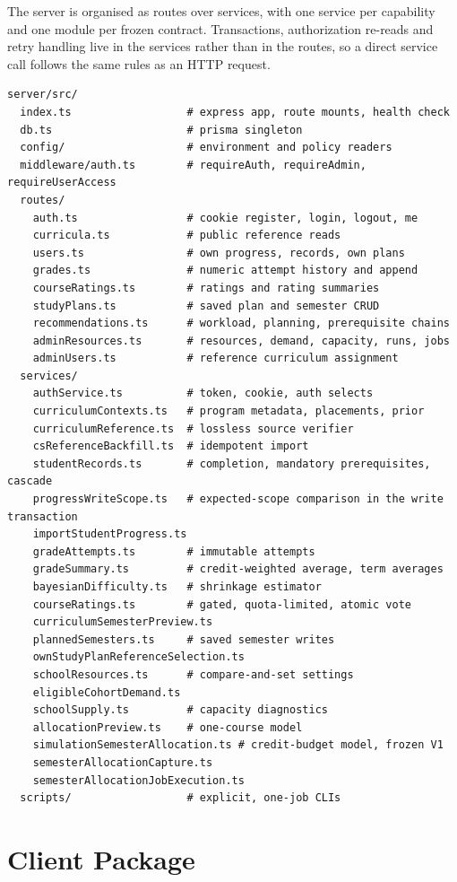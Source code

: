The server is organised as routes over services, with one service per capability and one module per
frozen contract. Transactions, authorization re-reads and retry handling live in the services rather
than in the routes, so a direct service call follows the same rules as an HTTP request.

\begin{lstlisting}
server/src/
  index.ts                  # express app, route mounts, health check
  db.ts                     # prisma singleton
  config/                   # environment and policy readers
  middleware/auth.ts        # requireAuth, requireAdmin, requireUserAccess
  routes/
    auth.ts                 # cookie register, login, logout, me
    curricula.ts            # public reference reads
    users.ts                # own progress, records, own plans
    grades.ts               # numeric attempt history and append
    courseRatings.ts        # ratings and rating summaries
    studyPlans.ts           # saved plan and semester CRUD
    recommendations.ts      # workload, planning, prerequisite chains
    adminResources.ts       # resources, demand, capacity, runs, jobs
    adminUsers.ts           # reference curriculum assignment
  services/
    authService.ts          # token, cookie, auth selects
    curriculumContexts.ts   # program metadata, placements, prior
    curriculumReference.ts  # lossless source verifier
    csReferenceBackfill.ts  # idempotent import
    studentRecords.ts       # completion, mandatory prerequisites, cascade
    progressWriteScope.ts   # expected-scope comparison in the write transaction
    importStudentProgress.ts
    gradeAttempts.ts        # immutable attempts
    gradeSummary.ts         # credit-weighted average, term averages
    bayesianDifficulty.ts   # shrinkage estimator
    courseRatings.ts        # gated, quota-limited, atomic vote
    curriculumSemesterPreview.ts
    plannedSemesters.ts     # saved semester writes
    ownStudyPlanReferenceSelection.ts
    schoolResources.ts      # compare-and-set settings
    eligibleCohortDemand.ts
    schoolSupply.ts         # capacity diagnostics
    allocationPreview.ts    # one-course model
    simulationSemesterAllocation.ts # credit-budget model, frozen V1
    semesterAllocationCapture.ts
    semesterAllocationJobExecution.ts
  scripts/                  # explicit, one-job CLIs
\end{lstlisting}

\section{Client Package}

